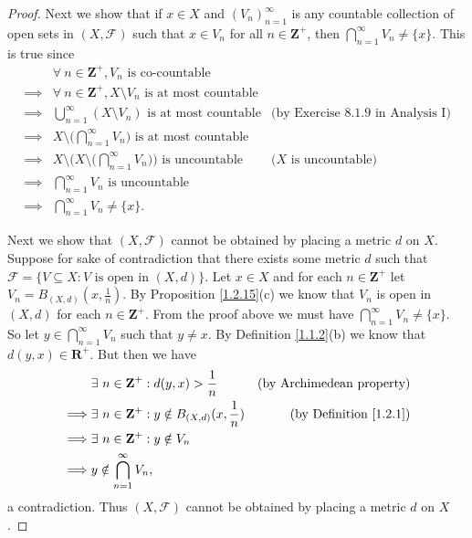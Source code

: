\begin{proof}
    Next we show that if \(x \in X\) and \((V_n)_{n = 1}^\infty\) is any countable collection of open sets in \((X, \mathcal{F})\) such that \(x \in V_n\) for all \(n \in \mathbf{Z}^+\), then \(\bigcap_{n = 1}^\infty V_n \neq \{x\}\).
    This is true since
    \begin{align*}
                 & \forall\ n \in \mathbf{Z}^+, V_n \text{ is co-countable}                                                                                     \\
        \implies & \forall\ n \in \mathbf{Z}^+, X \setminus V_n \text{ is at most countable}                                                                    \\
        \implies & \bigcup_{n = 1}^\infty (X \setminus V_n) \text{ is at most countable}                             & \text{(by Exercise 8.1.9 in Analysis I)} \\
        \implies & X \setminus \bigg(\bigcap_{n = 1}^\infty V_n\bigg) \text{ is at most countable}                                                              \\
        \implies & X \setminus \Bigg(X \setminus \bigg(\bigcap_{n = 1}^\infty V_n\bigg)\Bigg) \text{ is uncountable} & \text{(\(X\) is uncountable)}            \\
        \implies & \bigcap_{n = 1}^\infty V_n \text{ is uncountable}                                                                                            \\
        \implies & \bigcap_{n = 1}^\infty V_n \neq \{x\}.
    \end{align*}

    Next we show that \((X, \mathcal{F})\) cannot be obtained by placing a metric \(d\) on \(X\).
    Suppose for sake of contradiction that there exists some metric \(d\) such that \(\mathcal{F} = \{V \subseteq X : V \text{ is open in } (X, d)\}\).
    Let \(x \in X\) and for each \(n \in \mathbf{Z}^+\) let \(V_n = B_{(X, d)}(x, \frac{1}{n})\).
    By Proposition \ref{1.2.15}(c) we know that \(V_n\) is open in \((X, d)\) for each \(n \in \mathbf{Z}^+\).
    From the proof above we must have \(\bigcap_{n = 1}^\infty V_n \neq \{x\}\).
    So let \(y \in \bigcap_{n = 1}^\infty V_n\) such that \(y \neq x\).
    By Definition \ref{1.1.2}(b) we know that \(d(y, x) \in \mathbf{R}^+\).
    But then we have
    \begin{align*}
                 & \exists\ n \in \mathbf{Z}^+ : d(y, x) > \frac{1}{n}               & \text{(by Archimedean property)}   \\
        \implies & \exists\ n \in \mathbf{Z}^+ : y \notin B_{(X, d)}(x, \frac{1}{n}) & \text{(by Definition \ref{1.2.1})} \\
        \implies & \exists\ n \in \mathbf{Z}^+ : y \notin V_n                                                             \\
        \implies & y \notin \bigcap_{n = 1}^\infty V_n,
    \end{align*}
    a contradiction.
    Thus \((X, \mathcal{F})\) cannot be obtained by placing a metric \(d\) on \(X\).


\end{proof}
